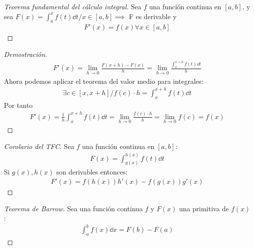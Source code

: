 \documentclass{article}
\begin{document}
\begin{proof}[Teorema fundamental del cálculo integral]
    Sea $f$ una función continua en $[a,b]$, y sea $F(x)= \int _{a}^x f(t) \dd{t} / x \in [a,b] \implies $ F es
    derivable y
    \begin{equation}
        \begin{split}
            F'(x)=f(x) \forall x \in [a,b]
        \end{split}
    \end{equation}
\end{proof}
\begin{proof}[Demostración]
    \begin{equation}
        \begin{split}
            F'(x) = \lim_{h \to 0} \frac{F(x+h) - F(x)}{h} = \lim_{h \to 0} \frac{ \int _{x}^{x+h} f(t) \dd{t}}{h}
        \end{split}
    \end{equation}
    Ahora podemos aplicar el teorema del valor medio para integrales:
    \begin{equation}
        \begin{split}
            \exists c \in [x,x+h] / f(c) \cdot h = \int _{x}^{x+h}f(t) \dd{t}
        \end{split}
    \end{equation}
    Por tanto
    \begin{equation}
        \begin{split}
            F'(x)= \frac{1}{h} \int _{x}^{x+h} f(t) \dd{t} = \lim_{h \to 0} \frac{f(c) \cdot h}{h}=\lim_{h \to 0}f(c)
            =f(x)
        \end{split}
    \end{equation}
\end{proof}
\begin{proof}[Corolario del TFC]
Sea $f$ una función continua en $[a,b]$:
\begin{equation}
    \begin{split}
        F(x)= \int _{g(x)}^{h(x)}f(t) \dd{t}
    \end{split}
\end{equation}
Si $g(x), h(x)$ son derivables entonces:
\begin{equation}
    \begin{split}
        F'(x)=f(h(x))h'(x) - f(g(x))g'(x)
    \end{split}
\end{equation}
\end{proof}
\begin{proof}[Teorema de Barrow]
    Sea una función continua $f$ y $F(x)$ una primitiva de $f(x)$:
    \begin{equation}
        \begin{split}
            \int _{a}^{b} f(x) \dd{x} = F(b)-F(a)
        \end{split}
    \end{equation}
\end{proof}
\end{document}
